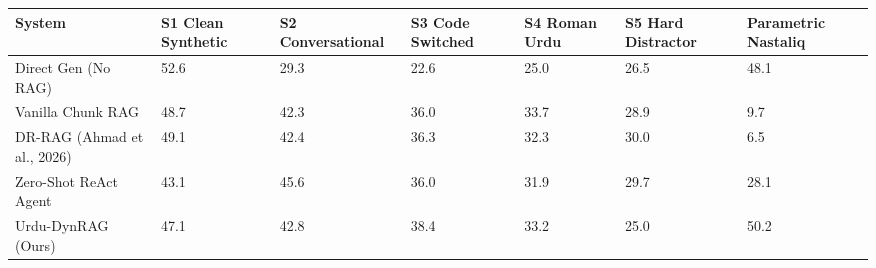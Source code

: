 \begin{tabular}{lllllll}
\toprule
System & S1 Clean Synthetic & S2 Conversational & S3 Code Switched & S4 Roman Urdu & S5 Hard Distractor & Parametric Nastaliq \\
\midrule
Direct Gen (No RAG) & 52.6 & 29.3 & 22.6 & 25.0 & 26.5 & 48.1 \\
Vanilla Chunk RAG & 48.7 & 42.3 & 36.0 & 33.7 & 28.9 & 9.7 \\
DR-RAG (Ahmad et al., 2026) & 49.1 & 42.4 & 36.3 & 32.3 & 30.0 & 6.5 \\
Zero-Shot ReAct Agent & 43.1 & 45.6 & 36.0 & 31.9 & 29.7 & 28.1 \\
Urdu-DynRAG (Ours) & 47.1 & 42.8 & 38.4 & 33.2 & 25.0 & 50.2 \\
\bottomrule
\end{tabular}
